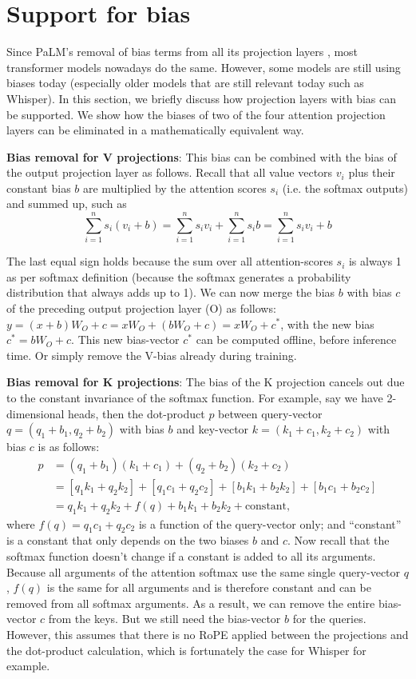 \documentclass{article}
\begin{document}
\section{Support for bias} \label{sec:bias}
Since PaLM’s removal of bias terms from all its projection layers \citep{PaLM}, most transformer models nowadays do the same. However, some models are still using biases today (especially older models that are still relevant today such as Whisper). In this section, we briefly discuss how projection layers with bias can be supported. We show how the biases of two of the four attention projection layers can be eliminated in a mathematically equivalent way.

\textbf{Bias removal for V projections}: This bias can be combined with the bias of the output projection layer as follows. Recall that all value vectors $v_i$ plus their constant bias $b$ are multiplied by the attention scores $s_i$ (i.e. the softmax outputs) and summed up, such as
\begin{equation*}
  \sum_{i=1}^n s_i (v_i + b) = \sum_{i=1}^n s_i v_i + \sum_{i=1}^n s_i b = \sum_{i=1}^n s_i v_i + b
\end{equation*}

The last equal sign holds because the sum over all attention-scores $s_i$ is always 1 as per softmax definition (because the softmax generates a probability distribution that always adds up to 1). We can now merge the bias $b$ with bias $c$ of the preceding output projection layer (O) as follows: $y = (x + b) W_O + c = x W_O + (b W_O + c) = x W_O + c^\ast$, with the new bias $c^\ast = b W_O + c$. This new bias-vector $c^\ast$ can be computed offline, before inference time. Or simply remove the V-bias already during training.

\textbf{Bias removal for K projections}: The bias of the K projection cancels out due to the constant invariance of the softmax function. For example, say we have 2-dimensional heads, then the dot-product $p$ between query-vector $q = (q_1 + b_1, q_2 + b_2)$ with bias $b$ and key-vector $k = (k_1 + c_1, k_2 + c_2)$ with bias $c$ is as follows:
\begin{align*}
  p &= (q_1 + b_1)(k_1 + c_1) + (q_2 + b_2)(k_2 + c_2) \\
    &= [q_1k_1 + q_2k_2] + [q_1c_1 + q_2c_2] + [b_1k_1 + b_2k_2] + [b_1c_1 + b_2c_2] \\
    &= q_1k_1 + q_2k_2 + f(q) + b_1k_1 + b_2k_2 + \text{constant},
\end{align*}
where $f(q) = q_1c_1 + q_2c_2$ is a function of the query-vector only; and “constant” is a constant that only depends on the two biases $b$ and $c$. Now recall that the softmax function doesn’t change if a constant is added to all its arguments. Because all arguments of the attention softmax use the same single query-vector $q$, $f(q)$ is the same for all arguments and is therefore constant and can be removed from all softmax arguments. As a result, we can remove the entire bias-vector $c$ from the keys. But we still need the bias-vector $b$ for the queries. However, this assumes that there is no RoPE applied between the projections and the dot-product calculation, which is fortunately the case for Whisper for example.
\end{document}
